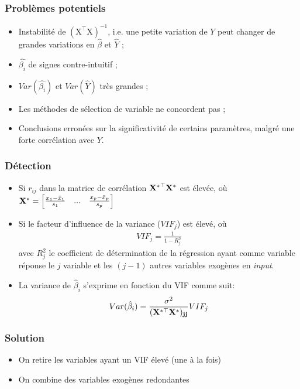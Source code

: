 \documentclass[10pt, french]{article}
\begin{document}
\begin{multicols*}{3}
\subsubsection*{Problèmes potentiels}
\begin{itemize}
\item Instabilité de $\mathrm{(X^\top X)^{-1}}$, i.e. une petite variation de $Y$ peut changer de grandes variations en $\hat{\beta}$ et $\hat{Y}$ ;
\item $\hat{\beta_i}$ de signes contre-intuitif ;
\item $Var(\hat{\beta_i})$ et $Var(\hat{Y})$ très grandes ;
\item Les méthodes de sélection de variable ne concordent pas ;
\item Conclusions erronées sur la significativité de certains paramètres, malgré une forte corrélation avec $Y$.
\end{itemize}

\subsubsection*{Détection}
\begin{itemize}
\item Si $r_{ij}$ dans la matrice de corrélation $\mathbf{{X^*}^\top X^*}$ est élevée, où $\mathbf{X^*} = \begin{bmatrix}
\frac{x_1 - \bar{x}_1}{s_1} & ... & \frac{x_p - \bar{x}_p}{s_p}
\end{bmatrix}$

\item Si le facteur d'influence de la variance ($VIF_j$) est élevé, où
\begin{align*}
VIF_j = \frac{1}{1 - R_j^2}
\end{align*}
avec $R_j^2$ le coefficient de détermination de la régression ayant comme variable réponse le $j$ variable et les $(j-1)$ autres variables exogènes en \textit{input}.
\item La variance de $\hat{\beta}_i$ s'exprime en fonction du VIF comme suit:
\begin{align*}
	Var(\hat{\beta}_i) = \frac{\sigma^2}{(\mathbf{X^{*\top} \mathbf{X^*})_{jj}}} VIF_j
\end{align*}
\end{itemize}

\subsubsection*{Solution}
\begin{itemize}
	\item On retire les variables ayant un VIF élevé (une à la fois)
	\item On combine des variables exogènes redondantes	
\end{itemize}


\end{multicols*}
\end{document}
